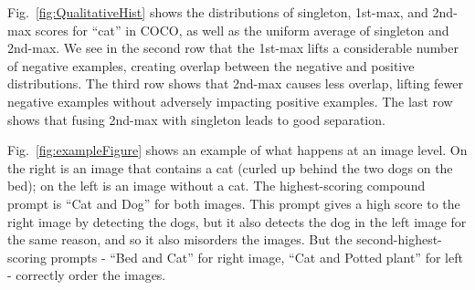 Fig.~\ref{fig:QualitativeHist} shows the distributions of singleton, 1st-max, and 2nd-max scores for ``cat'' in COCO, as well as the uniform average of singleton and 2nd-max. We see in the second row that the 1st-max lifts a considerable number of negative examples, creating overlap between the negative and positive distributions. The third row shows that 2nd-max causes less overlap, lifting fewer negative examples without adversely impacting positive examples. The last row shows that fusing 2nd-max with singleton leads to good separation.

Fig.~\ref{fig:exampleFigure} shows an example of what happens at an image level. On the right is an image that contains a cat (curled up behind the two dogs on the bed); on the left is an image without a cat. The highest-scoring compound prompt is ``Cat and Dog'' for both images. This prompt gives a high score to the right image by detecting the dogs, but it also detects the dog in the left image for the same reason, and so it also misorders the images. But the second-highest-scoring prompts - ``Bed and Cat'' for right image, ``Cat and Potted plant'' for left - correctly order the images.
